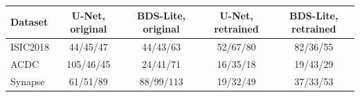 \begin{tabular}{lcccc}
\toprule
Dataset & U-Net, original & BDS-Lite, original & U-Net, retrained & BDS-Lite, retrained \\
\midrule
ISIC2018 & 44/45/47 & 44/43/63 & 52/67/80 & 82/36/55 \\
ACDC & 105/46/45 & 24/41/71 & 16/35/18 & 19/43/29 \\
Synapse & 61/51/89 & 88/99/113 & 19/32/49 & 37/33/53 \\
\bottomrule
\end{tabular}
